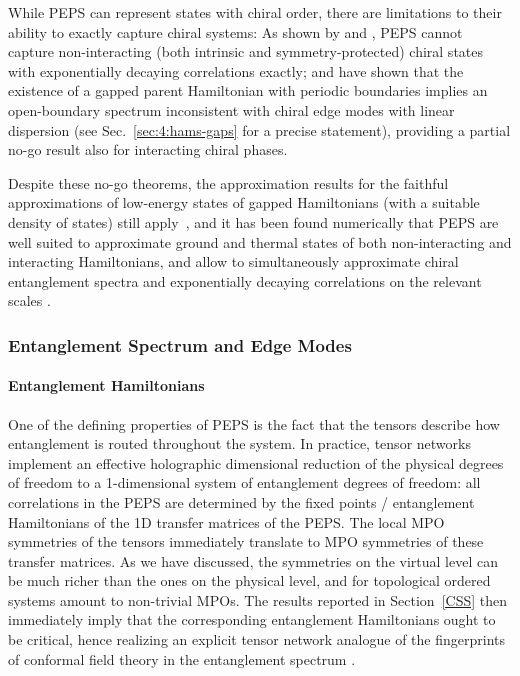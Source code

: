 \documentclass[rmp,aps,reprint,superscriptaddress,nobalancelastpage]{revtex4-1}
\begin{document}
While PEPS can represent states with chiral order, there are limitations to their ability to exactly capture chiral systems: As shown by \citet{dubail:chiral-fpeps} and \citet{read:chiral-peps-wannier-functions}, PEPS cannot capture non-interacting
(both intrinsic and symmetry-protected) chiral states with exponentially decaying correlations exactly; and \citet{mozgunov:knabe-bound-chiral} have shown that the existence of a gapped parent Hamiltonian with periodic boundaries implies an open-boundary spectrum inconsistent with chiral edge modes with linear dispersion (see Sec.~\ref{sec:4:hams-gaps} for a precise statement), providing a partial no-go result also for interacting chiral phases.

Despite these no-go theorems, the approximation results for the faithful approximations of low-energy states of gapped Hamiltonians (with a suitable density of states) still apply~\cite{hastings:locally,molnar:thermal-peps}, and it has been found numerically that PEPS are well suited to approximate ground and thermal states of both non-interacting
and interacting Hamiltonians, and allow to simultaneously approximate chiral entanglement spectra and exponentially decaying correlations on the relevant scales   \cite{wahl:chiral-fPEPS,poilblanc:chiral_hafm_squarelattice,chen:peps_su2_2_csl,chen:su3_peps_csl}.








\subsubsection{Entanglement Spectrum and Edge Modes \label{secESEM}}

\paragraph{Entanglement Hamiltonians}
One of the defining properties of PEPS is the fact that the tensors describe how entanglement is routed throughout the system. In practice, tensor networks implement an effective holographic dimensional reduction of the physical degrees of freedom to a 1-dimensional system of entanglement degrees of freedom: all correlations in the PEPS are determined by the fixed points / entanglement Hamiltonians of the 1D transfer matrices of the PEPS. The local MPO symmetries of the tensors immediately translate to MPO symmetries of these transfer matrices. As we have discussed, the symmetries on the virtual level can be much richer than the ones on the physical level, and for topological ordered systems amount to non-trivial MPOs. The results reported in Section~\ref{CSS} then immediately imply that the corresponding entanglement Hamiltonians ought to be critical, hence realizing an explicit tensor network analogue of the fingerprints of conformal field theory in the entanglement spectrum \cite{dubail:entanglement-spectrum,qi:bulk-boundary-duality}.
\end{document}
